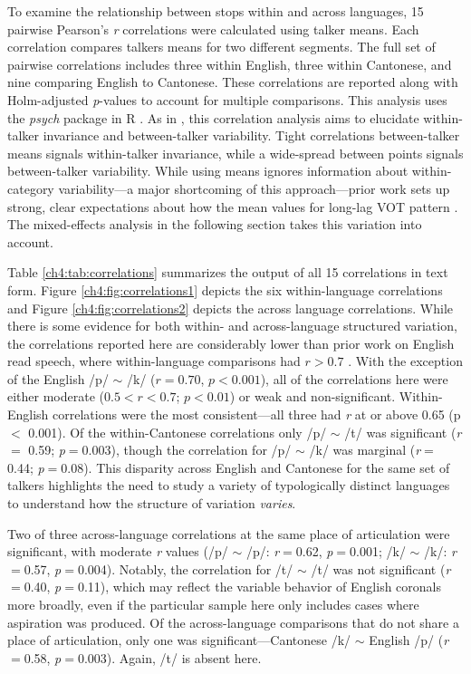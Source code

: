 To examine the relationship between stops within and across languages, 15 pairwise Pearson's \textit{r} correlations were calculated using talker means. Each correlation compares talkers means for two different segments. The full set of pairwise correlations includes three within English, three within Cantonese, and nine comparing English to Cantonese. These correlations are reported along with Holm-adjusted \textit{p}-values to account for multiple comparisons. This analysis uses the \textit{psych} \citep{revelle_2021_psych} package in R \citep{r_2021}. As in \citet{chodroff_2017_structure}, this correlation analysis aims to elucidate within-talker invariance and between-talker variability. Tight correlations between-talker means signals within-talker invariance, while a wide-spread between points signals between-talker variability. While using means ignores information about within-category variability---a major shortcoming of this approach---prior work sets up strong, clear expectations about how the mean values for long-lag VOT pattern \citep{chodroff_2017_structure, cho_1999_vot}. The mixed-effects analysis in the following section takes this variation into account.

Table \ref{ch4:tab:correlations} summarizes the output of all 15 correlations in text form. Figure \ref{ch4:fig:correlations1} depicts the six within-language correlations and Figure \ref{ch4:fig:correlations2} depicts the across language correlations. While there is some evidence for both within- and across-language structured variation, the correlations reported here are considerably lower than prior work on English read speech, where within-language comparisons had $r>0.7$ \citep{chodroff_2017_structure, chodroff_2019_l2}. With the exception of the English /p/ $\sim$ /k/ ($r=0.70$, $p<0.001$), all of the correlations here were either moderate ($0.5<r<0.7$; $p<0.01$) or weak and non-significant. Within-English correlations were the most consistent---all three had \textit{r} at or above 0.65 (p $<$ 0.001). Of the within-Cantonese correlations only /p/ $\sim$ /t/ was significant (\textit{r}$=$ 0.59; \textit{p}$=$0.003), though the correlation for /p/ $\sim$ /k/ was marginal (\textit{r}$=$ 0.44; \textit{p}$=$0.08). This disparity across English and Cantonese for the same set of talkers highlights the need to study a variety of typologically distinct languages to understand how the structure of variation \textit{varies}.

Two of three across-language correlations at the same place of articulation were significant, with moderate \textit{r} values (/p/ $\sim$ /p/: \textit{r}$=$0.62, \textit{p}$=$0.001; /k/ $\sim$ /k/: \textit{r}$=$0.57, \textit{p}$=$0.004). Notably, the correlation for /t/ $\sim$ /t/ was not significant (\textit{r}$=$0.40, \textit{p}$=$0.11), which may reflect the variable behavior of English coronals more broadly, even if the particular sample here only includes cases where aspiration was produced. Of the across-language comparisons that do not share a place of articulation, only one was significant---Cantonese /k/ $\sim$ English /p/ (\textit{r}$=$0.58, \textit{p}$=$0.003). Again, /t/ is absent here.

